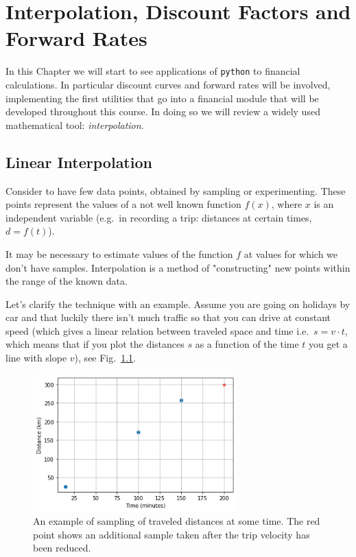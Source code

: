 \chapter{Interpolation, Discount Factors and Forward Rates}
\label{interpolation---practical-lesson-3}

In this Chapter we will start to see applications of \texttt{python} to financial calculations.
In particular discount curves and forward rates will be involved, implementing the first utilities that go into a financial module that will be developed throughout this course.
In doing so we will review a widely used mathematical tool: \emph{interpolation}.

\section{Linear Interpolation}
\label{linear-interpolation}

Consider to have few data points, obtained by sampling or experimenting. These points represent the values of a not well known function \(f(x)\), where \(x\) is an independent variable (e.g.~in recording a trip: distances at certain times, \(d = f(t)\)).

It may be necessary to estimate values of the function $f$ at values for which we don't have samples. Interpolation is a method of "constructing" new points within the range of the known data.

Let's clarify the technique with an example.
Assume you are going on holidays by car and that luckily there isn't much traffic so that you can drive at constant speed (which gives a linear relation between traveled space and time i.e.~\(s = v \cdot t\), which means that if you plot the distances \(s\) as a function of the time \(t\) you get a line with slope \(v\)), see Fig.~\ref{fig:samples_for_interpolation}.

\begin{figure}
  \centering
  \includegraphics[width=0.7\textwidth]{figures/interp_example1.png}
  \caption{An example of sampling of traveled distances at some time. The red point shows an additional sample taken after the trip velocity has been reduced.}
  \label{fig:samples_for_interpolation}
\end{figure}

